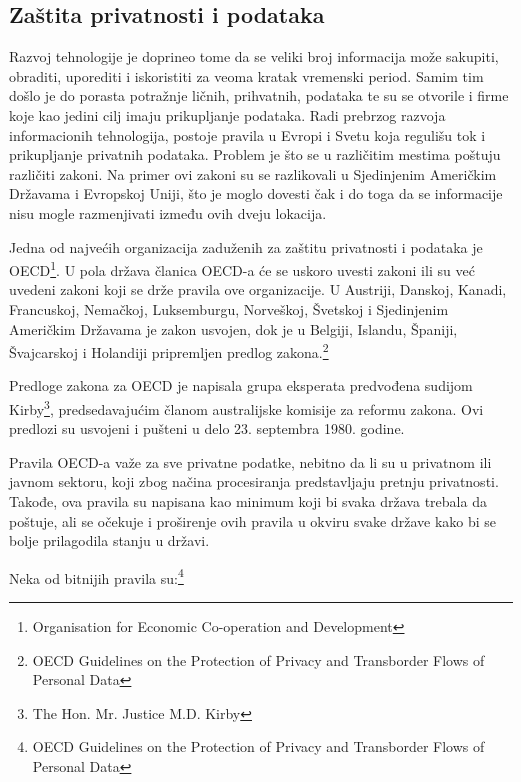 \documentclass[a4paper]{article}
\begin{document}
{\subsection{Zaštita privatnosti i podataka}

Razvoj tehnologije je doprineo tome da se veliki broj informacija može sakupiti, obraditi, uporediti i iskoristiti za veoma kratak vremenski period. Samim tim došlo je do porasta potražnje ličnih, prihvatnih, podataka te su se otvorile i firme koje kao jedini cilj imaju prikupljanje podataka. Radi prebrzog razvoja informacionih tehnologija, postoje pravila u Evropi i Svetu koja regulišu tok i prikupljanje privatnih podataka. Problem je što se u različitim mestima poštuju različiti zakoni. Na primer ovi zakoni su se razlikovali u Sjedinjenim Američkim Državama i Evropskoj Uniji, što je moglo dovesti čak i do toga da se informacije nisu mogle razmenjivati između ovih dveju lokacija.

Jedna od najvećih organizacija zaduženih za zaštitu privatnosti i podataka je OECD\footnote{Organisation for Economic Co-operation and Development}. U pola država članica OECD-a će se uskoro uvesti zakoni ili su već uvedeni zakoni koji se drže pravila ove organizacije. U Austriji, Danskoj, Kanadi, Francuskoj, Nemačkoj, Luksemburgu, Norveškoj, Švetskoj i Sjedinjenim Američkim Državama je zakon usvojen, dok je u Belgiji, Islandu, Španiji, Švajcarskoj i Holandiji pripremljen predlog zakona.\footnote{OECD Guidelines on the Protection of Privacy and Transborder Flows of Personal Data}

Predloge zakona za OECD je napisala grupa eksperata predvođena sudijom Kirby\footnote{The Hon. Mr. Justice M.D. Kirby}, predsedavajućim članom australijske komisije za reformu zakona. Ovi predlozi su usvojeni i pušteni u delo 23. septembra 1980. godine.

Pravila OECD-a važe za sve privatne podatke, nebitno da li su u privatnom ili javnom sektoru, koji zbog načina procesiranja predstavljaju pretnju privatnosti. Takođe, ova pravila su napisana kao minimum koji bi svaka država trebala da poštuje, ali se očekuje i proširenje ovih pravila u okviru svake države kako bi se bolje prilagodila stanju u državi.

Neka od bitnijih pravila su:\footnote{OECD Guidelines on the Protection of Privacy and Transborder Flows of Personal Data}

}
\end{document}
